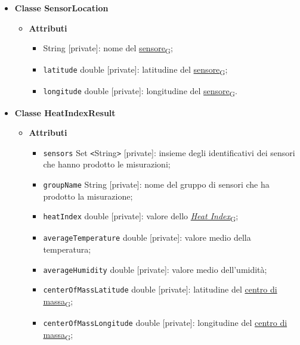 \begin{itemize}
\begin{itemize}
\begin{itemize}
		            \end{itemize}
	      \end{itemize}
	\item \textbf{Classe SensorLocation}
	      \begin{itemize}
		      \item \textbf{Attributi}
		            \begin{itemize}
			            \item \texttt{} String [private]: nome del \href{https://7last.github.io/docs/pb/documentazione-interna/glossario\#sensore}{sensore\textsubscript{G}};
			            \item \texttt{latitude} double [private]: latitudine del \href{https://7last.github.io/docs/pb/documentazione-interna/glossario\#sensore}{sensore\textsubscript{G}};
			            \item \texttt{longitude} double [private]: longitudine del \href{https://7last.github.io/docs/pb/documentazione-interna/glossario\#sensore}{sensore\textsubscript{G}}.
		            \end{itemize}
	      \end{itemize}
	\item \textbf{Classe HeatIndexResult}
	      \begin{itemize}
		      \item \textbf{Attributi}
		            \begin{itemize}
			            \item \texttt{sensors} Set \texttt{<}String\texttt{>} [private]: insieme degli identificativi dei sensori che hanno prodotto le misurazioni;
			            \item \texttt{groupName} String [private]: nome del gruppo di sensori che ha prodotto la misurazione;
			            \item \texttt{heatIndex} double [private]: valore dello \href{https://7last.github.io/docs/pb/documentazione-interna/glossario\#heat-index}{\textit{Heat Index}\textsubscript{G}};
			            \item \texttt{averageTemperature} double [private]: valore medio della temperatura;
			            \item \texttt{averageHumidity} double [private]: valore medio dell'umidità;
			            \item \texttt{centerOfMassLatitude} double [private]: latitudine del \href{https://7last.github.io/docs/pb/documentazione-interna/glossario\#centro-di-massa}{centro di massa\textsubscript{G}};
			            \item  \texttt{centerOfMassLongitude} double [private]: longitudine del \href{https://7last.github.io/docs/pb/documentazione-interna/glossario\#centro-di-massa}{centro di massa\textsubscript{G}};

\end{itemize}
\end{itemize}
\end{itemize}
